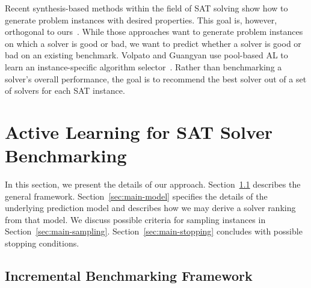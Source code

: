 \documentclass[runningheads]{llncs}
\begin{document}
Recent synthesis-based methods within the field of SAT solving show how to generate problem instances with desired properties.
This goal is, however, orthogonal to ours~\cite{0001AEMN22,GarzonMG22}.
While those approaches want to generate problem instances on which a solver is good or bad, we want to predict whether a solver is good or bad on an existing benchmark.
Volpato and Guangyan use pool-based AL to learn an instance-specific algorithm selector~\cite{volpato2019active}.
Rather than benchmarking a solver's overall performance, the goal is to recommend the best solver out of a set of solvers for each SAT instance.



\section{Active Learning for SAT Solver Benchmarking}
\label{sec:main}

In this section, we present the details of our approach.
Section~\ref{sec:main-framework} describes the general framework.
Section~\ref{sec:main-model} specifies the details of the underlying prediction model and describes how we may derive a solver ranking from that model.
We discuss possible criteria for sampling instances in Section~\ref{sec:main-sampling}.
Section~\ref{sec:main-stopping} concludes with possible stopping conditions.


\subsection{Incremental Benchmarking Framework}
\label{sec:main-framework}
\end{document}
